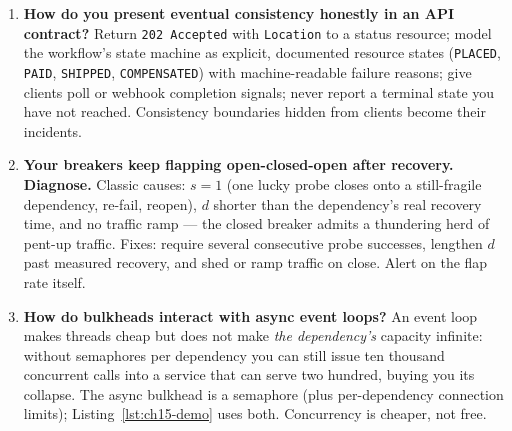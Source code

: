 \begin{enumerate}[label=\textbf{Q\arabic*.}, leftmargin=1.6cm, start=21]
        schema evolution, end-to-end deadline budgets across business
        operations, or knowing which of your failures are retryable. The
        mesh owns transport hygiene; the application still owns semantics.
  \item \textbf{How do you present eventual consistency honestly in an API
        contract?}
        Return \texttt{202 Accepted} with \texttt{Location} to a status
        resource; model the workflow's state machine as explicit,
        documented resource states (\texttt{PLACED}, \texttt{PAID},
        \texttt{SHIPPED}, \texttt{COMPENSATED}) with machine-readable
        failure reasons; give clients poll or webhook completion signals;
        never report a terminal state you have not reached. Consistency
        boundaries hidden from clients become their incidents.
  \item \textbf{Your breakers keep flapping open-closed-open after
        recovery. Diagnose.}
        Classic causes: $s = 1$ (one lucky probe closes onto a still-fragile
        dependency, re-fail, reopen), $d$ shorter than the dependency's
        real recovery time, and no traffic ramp --- the closed breaker
        admits a thundering herd of pent-up traffic. Fixes: require several
        consecutive probe successes, lengthen $d$ past measured recovery,
        and shed or ramp traffic on close. Alert on the flap rate itself.
  \item \textbf{How do bulkheads interact with async event loops?}
        An event loop makes threads cheap but does not make \emph{the
        dependency's} capacity infinite: without semaphores per dependency
        you can still issue ten thousand concurrent calls into a service
        that can serve two hundred, buying you its collapse. The async
        bulkhead is a semaphore (plus per-dependency connection limits);
        Listing~\ref{lst:ch15-demo} uses both. Concurrency is cheaper, not
        free.
\end{enumerate}

